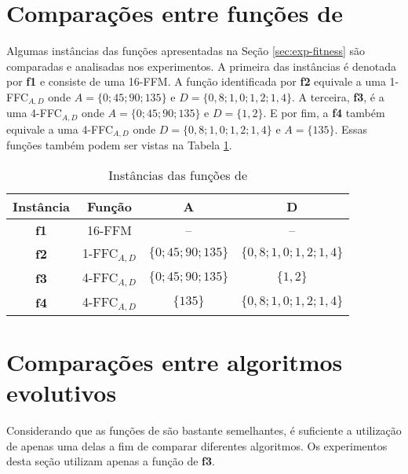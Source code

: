 
\section{Comparações entre funções de \fitness}
\label{sec:exp-comp-fitness}

Algumas instâncias das funções apresentadas na Seção \ref{sec:exp-fitness} são comparadas e analisadas nos experimentos. A primeira das instâncias é denotada por \textbf{f1} e consiste de uma 16-FFM. A função identificada por \textbf{f2} equivale a uma 1-FFC$_{A,D}$ onde $A = \{0; 45; 90; 135\}$ e $D = \{0,8; 1,0; 1,2; 1,4\}$. A terceira, \textbf{f3}, é a uma 4-FFC$_{A,D}$ onde $A = \{0; 45; 90; 135\}$ e $D = \{1,2\}$. E por fim, a \textbf{f4} também equivale a uma 4-FFC$_{A,D}$ onde $D = \{0,8; 1,0; 1,2; 1,4\}$ e $A = \{135\}$. Essas funções também podem ser vistas na Tabela \ref{tab:fitness-functions}.

\begin{table}[H]
    \centering
    \begin{tabular}{| c | c | c | c |}
        \hline
        Instância & Função & A & D \\ \hline
        \textbf{f1} & 16-FFM & -- & -- \\ \hline
        \textbf{f2} & 1-FFC$_{A,D}$ & $\{0; 45; 90; 135\}$ & $\{0,8; 1,0; 1,2; 1,4\}$ \\ \hline
        \textbf{f3} & 4-FFC$_{A,D}$ & $\{0; 45; 90; 135\}$ & $\{1,2\}$ \\ \hline
        \textbf{f4} & 4-FFC$_{A,D}$ & $\{135\}$ & $\{0,8; 1,0; 1,2; 1,4\}$ \\ \hline
    \end{tabular}
    \caption{Instâncias das funções de \fitness}
    \label{tab:fitness-functions}
\end{table}


\section{Comparações entre algoritmos evolutivos}
\label{sec:exp-comp-algorithms}

Considerando que as funções de \fitness são bastante semelhantes, é suficiente a utilização de apenas uma delas a fim de comparar diferentes algoritmos. Os experimentos desta seção utilizam apenas a função de \fitness \textbf{f3}.

